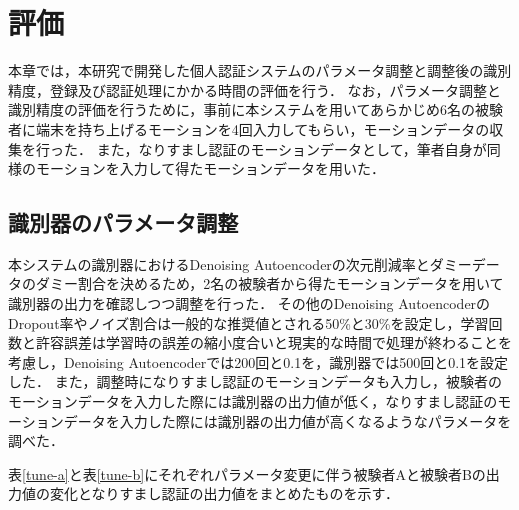 \chapter{評価}
本章では，本研究で開発した個人認証システムのパラメータ調整と調整後の識別精度，登録及び認証処理にかかる時間の評価を行う．
なお，パラメータ調整と識別精度の評価を行うために，事前に本システムを用いてあらかじめ6名の被験者に端末を持ち上げるモーションを4回入力してもらい，モーションデータの収集を行った．
また，なりすまし認証のモーションデータとして，筆者自身が同様のモーションを入力して得たモーションデータを用いた．

\section{識別器のパラメータ調整}
本システムの識別器におけるDenoising Autoencoderの次元削減率とダミーデータのダミー割合を決めるため，2名の被験者から得たモーションデータを用いて識別器の出力を確認しつつ調整を行った．
その他のDenoising AutoencoderのDropout率やノイズ割合は一般的な推奨値とされる50\%と30\%を設定し，学習回数と許容誤差は学習時の誤差の縮小度合いと現実的な時間で処理が終わることを考慮し，Denoising Autoencoderでは200回と0.1を，識別器では500回と0.1を設定した．
また，調整時になりすまし認証のモーションデータも入力し，被験者のモーションデータを入力した際には識別器の出力値が低く，なりすまし認証のモーションデータを入力した際には識別器の出力値が高くなるようなパラメータを調べた．

表\ref{tune-a}と表\ref{tune-b}にそれぞれパラメータ変更に伴う被験者Aと被験者Bの出力値の変化となりすまし認証の出力値をまとめたものを示す．


